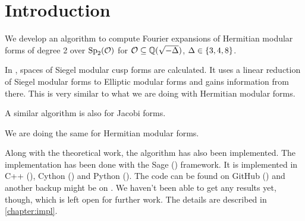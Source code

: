 
\section{Introduction}

We develop an algorithm to compute Fourier expansions of Hermitian modular forms of degree 2 over $\operatorname{Sp}_2(\mathcal{O})$ for $\mathcal{O} \subseteq \mathbb{Q}(\sqrt{-\Delta})$, $\Delta \in \Set{3,4,8}$.

In \cite{PoorYuen07Comp}, spaces of Siegel modular cusp forms are calculated. It uses a linear reduction of Siegel modular forms to Elliptic modular forms and gains information from there. This is very similar to what we are doing with Hermitian modular forms.

A similar algorithm is also \cite[Algorithm 4.3]{Raum12Jacobi} for Jacobi forms.

We are doing the same for Hermitian modular forms.

Along with the theoretical work, the algorithm has also been implemented. The implementation has been done with the Sage (\cite{sage}) framework. It is implemented in C++ (\cite{cpp}), Cython (\cite{cython}) and Python (\cite{python}). The code can be found on GitHub (\cite{Zeyer13Github}) and another backup might be on \cite{Zeyer13Homepage}. We haven't been able to get any results yet, though, which is left open for further work. The details are described in \cref{chapter:impl}.
